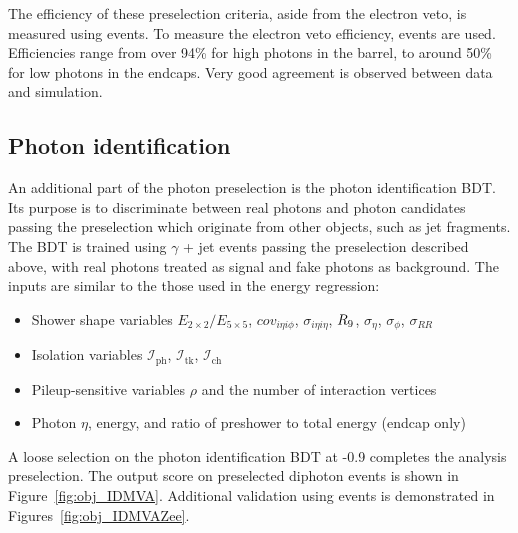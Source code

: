 The efficiency of these preselection criteria, aside from the electron veto, is measured using \Zee events.
To measure the electron veto efficiency, \Zmumug events are used.
Efficiencies range from over 94\% for high \RNINE photons in the barrel, 
to around 50\% for low \RNINE photons in the endcaps.
Very good agreement is observed between data and simulation. %

\subsection{Photon identification}

An additional part of the photon preselection is the photon identification BDT.
Its purpose is to discriminate between real photons and photon candidates passing the preselection which originate from other objects, 
such as jet fragments.
The BDT is trained using $\gamma$ + jet events passing the preselection described above, with real photons treated as signal and fake photons as background.
The inputs are similar to the those used in the energy regression:
\begin{itemize}
  \item Shower shape variables $E_{2\times2}/E_{5\times5}$, $cov_{i\eta i\phi}$, $\sigma_{i\eta i\eta}$, $R_9$, $\sigma_{\eta}$, $\sigma_{\phi}$, $\sigma_{RR}$
  \item Isolation variables $\mathcal{I}_{\text{ph}}$, $\mathcal{I}_{\text{tk}}$, $\mathcal{I}_{\text{ch}}$
  \item Pileup-sensitive variables $\rho$ and the number of interaction vertices
  \item Photon $\eta$, energy, and ratio of preshower to total energy (endcap only)
\end{itemize}

A loose selection on the photon identification BDT at -0.9 completes the analysis preselection.
The output score on preselected diphoton events is shown in Figure~\ref{fig:obj_IDMVA}.
Additional validation using \Zee events is demonstrated in Figures~\ref{fig:obj_IDMVAZee}.

